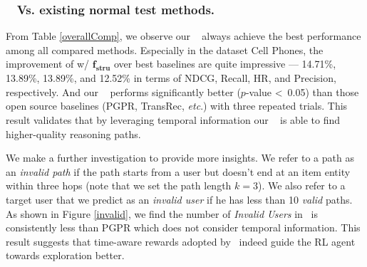 \subsubsection{\textbf{\tkgrec~ Vs. existing normal test methods.}}
From Table \ref{overallComp}, we observe our \tkgrec~ always achieve the best performance among all compared methods. Especially in the dataset Cell Phones, the improvement of w/ $\boldsymbol{f_{stru}}$ over best baselines are quite impressive --- 14.71\%, 13.89\%, 13.89\%, and 12.52\% in terms of NDCG, Recall, HR, and Precision, respectively. 
%
%
And our \tkgrec~ performs significantly better ($p$-value \textless\ 0.05) than those open source baselines (PGPR, TransRec, \textit{etc}.) with three repeated trials.
%
This result validates that by leveraging temporal information our \tkgrec~ is able to find higher-quality reasoning paths.  

We make a further investigation to provide more insights. We refer to a path as an \textit{invalid path} if the path starts from a user but doesn't end at an item entity within three hops (note that we set the path length $k=3$). We also refer to a target user that we predict  as an \textit{invalid user} if he has less than 10 \textit{valid} paths. As shown in Figure \ref{invalid}, we find the number of \textit{Invalid Users} in \tkgrec\ is consistently less than PGPR which does not consider temporal information. This result suggests that time-aware rewards adopted by \tkgrec\ indeed guide the RL agent towards exploration better.


%

